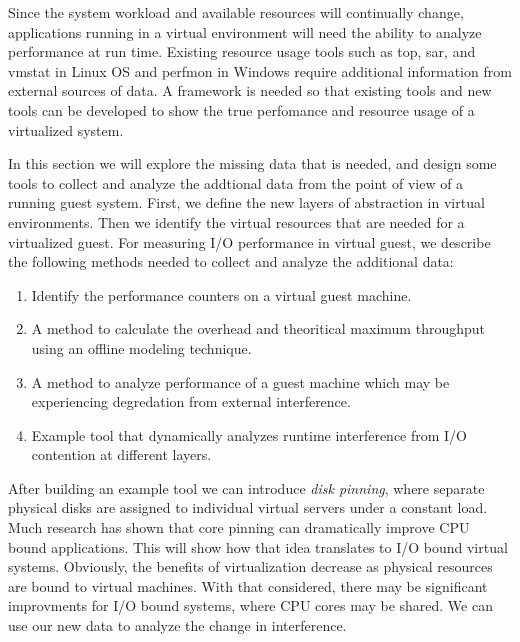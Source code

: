 Since the system workload and available resources will continually change, applications running in a virtual environment will need the ability to analyze performance at run time.  Existing resource usage tools such as top, sar, and vmstat in Linux OS and perfmon in Windows require additional information from external sources of data.  A framework is needed so that existing tools and new tools can be developed to show the true perfomance and resource usage of a virtualized system.

\indent  In this section we will explore the missing data that is needed, and design some tools to collect and analyze the addtional data from the point of view of a running guest system. First, we define the new layers of abstraction in virtual environments.  Then we identify the virtual resources that are needed for a virtualized guest.  For measuring I/O performance in virtual guest, we describe the following methods needed to collect and analyze the additional data:
\begin {enumerate}
\item Identify the performance counters on a virtual guest machine.
\item A method to calculate the overhead and theoritical maximum throughput using an offline modeling technique.
\item A method to analyze performance of a guest machine which may be experiencing degredation from external interference.
\item Example tool that dynamically analyzes runtime interference from I/O contention at different layers.
\end{enumerate}

After building an example tool we can introduce \emph{disk pinning}, where separate physical disks are assigned to individual virtual servers under a constant load.  Much research has shown that core pinning can dramatically improve CPU bound applications.  This will show how that idea translates to I/O bound virtual systems.  Obviously, the benefits of virtualization decrease as physical resources are bound to virtual machines.  With that considered, there may be significant improvments for I/O bound systems, where CPU cores may be shared.  We can use our new data to analyze the change in interference.

